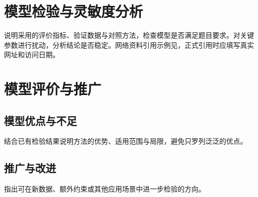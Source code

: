 \section{模型检验与灵敏度分析}
说明采用的评价指标、验证数据与对照方法，检查模型是否满足题目要求。对关键参数进行扰动，分析结论是否稳定。网络资料引用示例见\cite{sampleonline}，正式引用时应填写真实网址和访问日期。

\section{模型评价与推广}
\subsection{模型优点与不足}
结合已有检验结果说明方法的优势、适用范围与局限，避免只罗列泛泛的优点。

\subsection{推广与改进}
指出可在新数据、额外约束或其他应用场景中进一步检验的方向。
